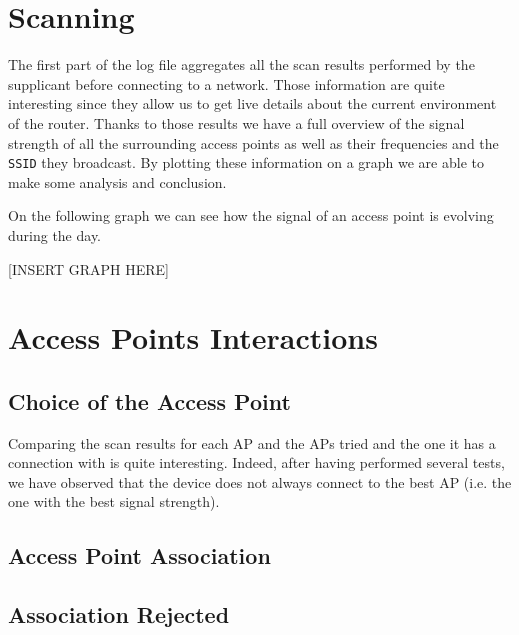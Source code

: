 
\section{Scanning}
The first part of the log file aggregates all the scan results performed by the supplicant before connecting to a network. Those information are quite interesting since they allow us to get live details about the current environment of the router. Thanks to those results we have a full overview of the signal strength of all the surrounding access points as well as their frequencies and the \texttt{SSID} they broadcast. By plotting these information on a graph we are able to make some analysis and conclusion.

On the following graph we can see how the signal of an access point is evolving during the day. 

[INSERT GRAPH HERE]



\section{Access Points Interactions}


\subsection{Choice of the Access Point}

Comparing the scan results for each AP and the APs tried and the one it has a connection with is quite interesting. Indeed, after having performed several tests, we have observed that the device does not always connect to the best AP (i.e. the one with the best signal strength).



\subsection{Access Point Association}

\subsection{Association Rejected}


